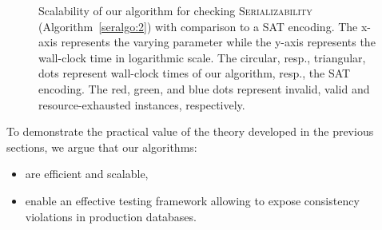 \begin{figure}
\begin{subfigure}{.33\textwidth}
  \label{ser_variable_scale}
 \end{subfigure}
 \vspace{-3mm}
 \caption{Scalability of our algorithm for checking \textsc{Serializability} (Algorithm~\ref{seralgo:2}) with comparison to a SAT encoding. The x-axis represents the varying parameter while the y-axis represents the wall-clock time in logarithmic scale. The circular, resp., triangular, dots represent wall-clock times of our algorithm, resp., the SAT encoding. The red, green, and blue dots represent invalid, valid and resource-exhausted instances, respectively.}
 \label{ser_performace_scale}
 \vspace{-3mm}
\end{figure}


To demonstrate the practical value of the theory developed in the previous sections, we argue that our algorithms:
\begin{itemize}
 \item are efficient and scalable, %
 \item enable an effective testing framework allowing to expose consistency violations in production databases.
\end{itemize}

